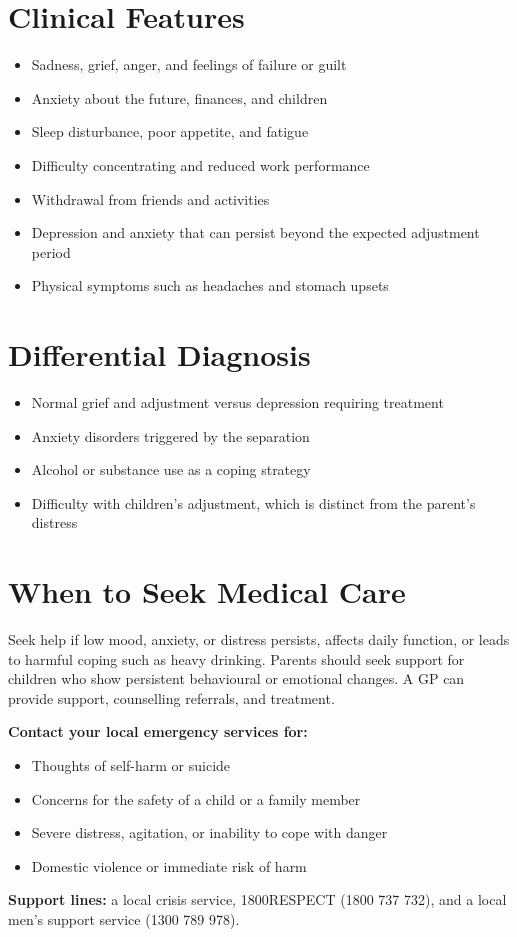 \section*{Clinical Features}
\begin{itemize}
    \item Sadness, grief, anger, and feelings of failure or guilt
    \item Anxiety about the future, finances, and children
    \item Sleep disturbance, poor appetite, and fatigue
    \item Difficulty concentrating and reduced work performance
    \item Withdrawal from friends and activities
    \item Depression and anxiety that can persist beyond the expected adjustment period
    \item Physical symptoms such as headaches and stomach upsets
\end{itemize}

\section*{Differential Diagnosis}
\begin{itemize}
    \item Normal grief and adjustment versus depression requiring treatment
    \item Anxiety disorders triggered by the separation
    \item Alcohol or substance use as a coping strategy
    \item Difficulty with children's adjustment, which is distinct from the parent's distress
\end{itemize}

\section*{When to Seek Medical Care}
Seek help if low mood, anxiety, or distress persists, affects daily function, or leads to harmful coping such as heavy drinking. Parents should seek support for children who show persistent behavioural or emotional changes. A GP can provide support, counselling referrals, and treatment.

\textbf{Contact your local emergency services for:}
\begin{itemize}
    \item Thoughts of self-harm or suicide
    \item Concerns for the safety of a child or a family member
    \item Severe distress, agitation, or inability to cope with danger
    \item Domestic violence or immediate risk of harm
\end{itemize}
\textbf{Support lines:} a local crisis service, 1800RESPECT (1800 737 732), and a local men's support service (1300 789 978).


